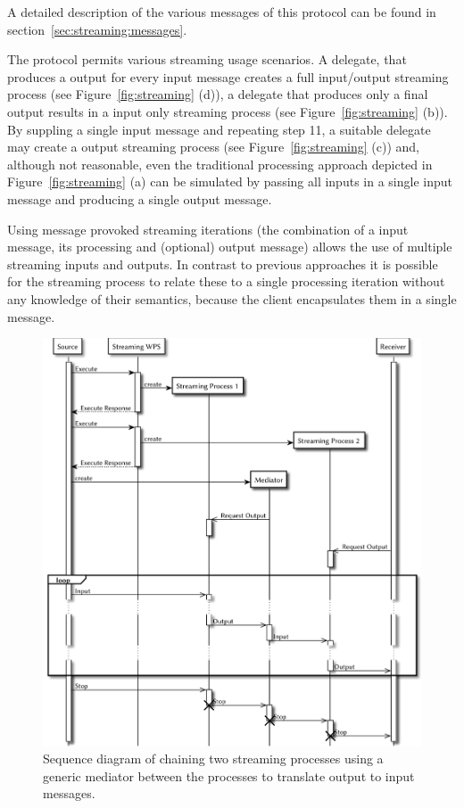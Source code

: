 	A detailed description of the various messages of this protocol can be found in section~\ref{sec:streaming:messages}.

	The protocol permits various streaming usage scenarios. A delegate, that produces a output for every input message creates a full input/output streaming process (see Figure~\ref{fig:streaming} (d)), a delegate that produces only a final output results in a input only streaming process (see Figure~\ref{fig:streaming} (b)). By suppling a single input message and repeating step 11, a suitable delegate may create a output streaming process (see Figure~\ref{fig:streaming} (c)) and, although not reasonable, even the traditional processing approach depicted in Figure~\ref{fig:streaming} (a) can be simulated by passing all inputs in a single input message and producing a single output message.

	Using message provoked streaming iterations (the combination of a input message, its processing and (optional) output message) allows the use of multiple streaming inputs and outputs. In contrast to previous approaches it is possible for the streaming process to relate these to a single processing iteration without any knowledge of their semantics, because the client encapsulates them in a single message.

	\begin{figure}[!htb]
		\centering
		\includegraphics[width=\textwidth]{figures/sequence-diagramm-chain.pdf} %
		\caption{\label{fig:sd:chain} Sequence diagram of chaining two streaming processes using a generic mediator between the processes to translate output to input messages.}
	\end{figure}

